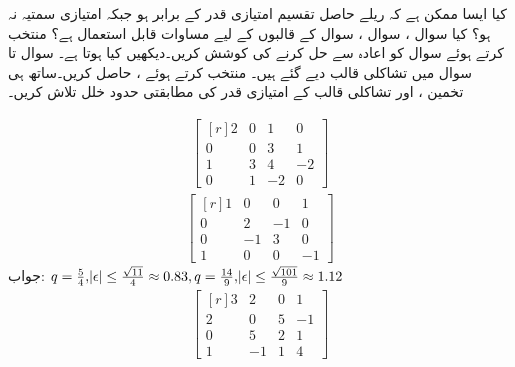 کیا ایسا ممکن ہے کہ ریلے حاصل تقسیم  امتیازی قدر کے برابر ہو جبکہ  امتیازی سمتیہ نہ ہو؟
\quad 
کیا سوال ، سوال ، سوال  کے قالبوں کے  لیے مساوات  قابل  استعمال ہے؟
\quad
{} منتخب کرتے ہوئے سوال  کو اعادہ سے حل کرنے کی کوشش کریں۔دیکھیں کیا ہوتا ہے۔
سوال  تا سوال  میں تشاکلی قالب دیے گئے ہیں۔  منتخب کرتے ہوئے ،  حاصل کریں۔ساتھ ہی  تخمین  ، 
   اور تشاکلی قالب کے امتیازی قدر کی مطابقتی حدود خلل تلاش کریں۔ 

\quad
\begin{align*}
\begin{bmatrix*}[r] 2&0&1&0\\ 0&0&3&1\\1&3&4&-2\\0&1&-2&0  \end{bmatrix*}
\end{align*}
\quad
\begin{align*}
\begin{bmatrix*}[r] 1&0&0&1\\ 0&2&-1&0\\0&-1&3&0\\1&0&0&-1  \end{bmatrix*}
\end{align*}
جواب:\quad
$q=\tfrac{5}{4},\abs{\epsilon}\le \tfrac{\sqrt{11}}{4}\approx 0.83, q=\tfrac{14}{9},\abs{\epsilon}\le \tfrac{\sqrt{101}}{9}\approx 1.12$
\quad
\begin{align*}
\begin{bmatrix*}[r] 3&2&0&1\\2&0&5&-1\\0&5&2&1\\1&-1&1&4 \end{bmatrix*}
\end{align*}

